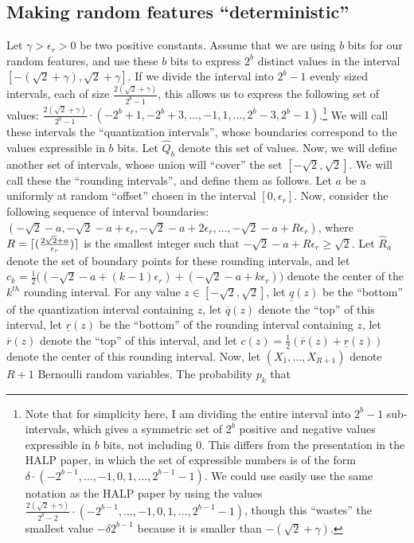 \documentclass[12pt]{article}
\newcommand{\sq}{\sqrt{2}}
\newcommand{\eps}{\epsilon}
\newcommand{\ulq}{\underline{q}}
\newcommand{\olq}{\overline{q}}
\newcommand{\ulr}{\underline{r}}
\newcommand{\olr}{\overline{r}}
\begin{document}
\subsection{Making random features ``deterministic''}
Let $\gamma > \eps_r > 0$ be two positive constants. Assume that we are using $b$ bits for our random features, and use these $b$ bits to express $2^b$ distinct values in the interval $[-(\sq + \gamma),\sq + \gamma]$.  If we divide the interval into $2^b - 1$ evenly sized intervals, each of size $\frac{2(\sq+\gamma)}{2^b - 1}$, this allows us to express the following set of values: $\frac{2(\sq+\gamma)}{2^b - 1}\cdot (-2^b + 1, -2^b + 3,\ldots, -1,1,\ldots, 2^b-3, 2^b -1)$.\footnote{Note that for simplicity here, I am dividing the entire interval into $2^b -1$ sub-intervals, which gives a symmetric set of $2^b$ positive and negative values expressible in $b$ bits, not including 0.  This differs from the presentation in the HALP paper, in which the set of expressible numbers is of the form $\delta\cdot (-2^{b-1}, \ldots, -1,0,1,\ldots,2^{b-1}-1)$.  We could use easily use the same notation as the HALP paper by using the values $\frac{2(\sq + \gamma)}{2^b-2}\cdot(-2^{b-1}, \ldots, -1,0,1,\ldots,2^{b-1}-1)$, though this ``wastes'' the smallest value $-\delta 2^{b-1}$ because it is smaller than $-(\sq + \gamma)$.}  We will call these intervals the ``quantization intervals'', whose boundaries correspond to the values expressible in $b$ bits.  Let $\hat{Q}_b$ denote this set of values.  Now, we will define another set of intervals, whose union will ``cover'' the set $[-\sq,\sq]$.  We will call these the ``rounding intervals'', and define them as follows.  Let $a$ be a uniformly at random ``offset'' chosen in the interval $[0,\eps_r]$.  Now, consider the following sequence of interval boundaries: $(-\sq-a,-\sq-a+\eps_r,-\sq-a+2\eps_r,\ldots,-\sq-a+R\eps_r)$, where $R=\ceil{(\frac{2\sq + a}{\eps_r})}$ is the smallest integer such that $-\sq-a+R\eps_r \geq \sq$.  Let $\hat{R}_a$ denote the set of boundary points for these rounding intervals, and let $c_k = \frac{1}{2}\Big((-\sq-a+(k-1)\eps_r) + (-\sq-a+k\eps_r)\Big)$ denote the center of the $k^{th}$ rounding interval.  For any value $z\in[-\sq,\sq]$, let $\ulq(z)$ be the ``bottom'' of the quantization interval containing $z$, let $\olq(z)$ denote the ``top'' of this interval, let $\ulr(z)$ be the ``bottom'' of the rounding interval containing $z$, let $\olr(z)$ denote the ``top'' of this interval, and let $c(z) =\frac{1}{2}(\olr(z) + \ulr(z))$  denote the center of this rounding interval.  Now, let $(X_1,\ldots,X_{R+1})$ denote $R+1$ Bernoulli random variables. The probability $p_k$ that
\end{document}
